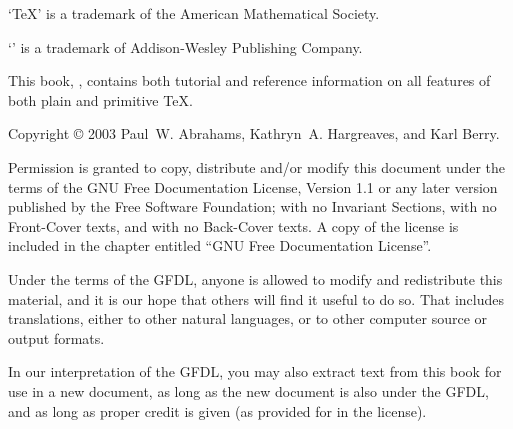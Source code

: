 



% 
\noheadlinetrue
\sinkage

\noindent `\TeX' is a trademark of the American Mathematical Society.

\noindent `\Metafont' is a trademark of Addison-Wesley Publishing Company.

\bigskip
\noindent This book, \thisbook, contains both tutorial and reference
information on all features of both plain and primitive \TeX.

\bigskip

\noindent Copyright \copyright{} 2003 Paul~W. Abrahams,
Kathryn~A. Hargreaves, and Karl Berry.

\bigskip
\noindent Permission is granted to copy, distribute and/or modify this
document under the terms of the GNU Free Documentation License, Version
1.1 or any later version published by the Free Software Foundation; with
no Invariant Sections, with no Front-Cover texts, and with no Back-Cover
texts.  A copy of the license is included in the chapter entitled ``GNU
Free Documentation License''.

\medskip\noindent
Under the terms of the GFDL, anyone is allowed to modify and
redistribute this material, and it is our hope that others will find it
useful to do so.  That includes translations, either to other natural
languages, or to other computer source or output formats.

\medskip\noindent
In our interpretation of the GFDL, you may also extract text from this
book for use in a new document, as long as the new document is also
under the GFDL, and as long as proper credit is given (as provided for
in the license).


\pagebreak
\byebye
